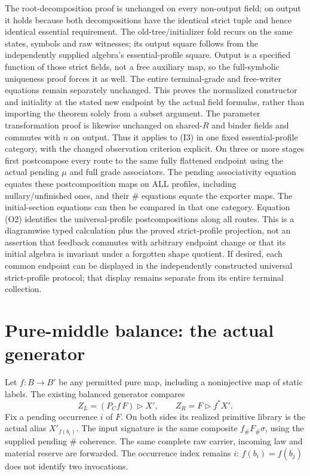\documentclass[11pt]{article}
\begin{document}
The root-decomposition proof is unchanged on every non-output field; on output it holds because both decompositions have the identical strict tuple and hence identical essential requirement. The old-tree/initializer fold recurs on the same states, symbols and raw witnesses; its output square follows from the independently supplied algebra's essential-profile square. Output is a specified function of those strict fields, not a free auxiliary map, so the full-symbolic uniqueness proof forces it as well. The entire terminal-grade and free-writer equations remain separately unchanged. This proves the normalized constructor and initiality at the stated new endpoint by the actual field formulas, rather than importing the theorem solely from a subset argument. The parameter transformation proof is likewise unchanged on shared-$R$ and binder fields and commutes with $n$ on output. Thus it applies to (I3) in one fixed essential-profile category, with the changed observation criterion explicit. On three or more stages first postcompose every route to the same fully flattened endpoint using the actual pending $\mu$ and full grade associators. The pending associativity equation equates these postcomposition maps on ALL profiles, including nullary/unfinished ones, and their $\#$ equations equate the exporter maps. The initial-section equations can then be compared in that one category. Equation (O2) identifies the universal-profile postcompositions along all routes. This is a diagramwise typed calculation plus the proved strict-profile projection, not an assertion that feedback commutes with arbitrary endpoint change or that its initial algebra is invariant under a forgotten shape quotient. If desired, each common endpoint can be displayed in the independently constructed universal strict-profile protocol; that display remains separate from its entire terminal collection.

\section{Pure-middle balance: the actual generator}
Let $f:B\to B'$ be any permitted pure map, including a noninjective map of static labels. The existing balanced generator compares
\[
 Z_L=(P_Cf\,F)\triangleright X',\qquad
 Z_R=F\triangleright f^*X'.                               \tag{2}
\]
Fix a pending occurrence $i$ of $F$. On both sides its realized primitive library is the actual alias $X'_{f(b_i)}$. The input signature is the same composite $f_\#F_\#\sigma$, using the supplied pending $\#$ coherence. The same complete raw carrier, incoming law and material reserve are forwarded. The occurrence index remains $i$: $f(b_i)=f(b_j)$ does not identify two invocations.
\end{document}
